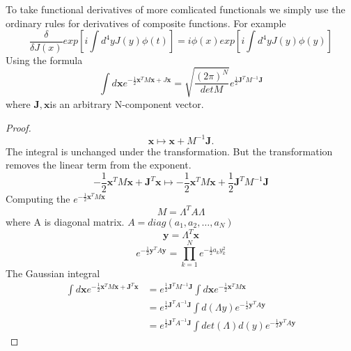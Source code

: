 \documentclass[a4paper,11pt]{article}
\newtheorem{proof}{proof}[section]
\begin{document}
To take functional derivatives of more comlicated functionals we simply use the ordinary rules for derivatives of composite functions. For example
\begin{equation*}
  \frac{\delta}{\delta J(x)}exp\left[i\int d^4y J(y)\phi(t)\right]=i\phi(x)exp\left[i\int d^4y J(y)\phi(y)\right]
\end{equation*}
Using the formula
\begin{equation*}
  \int d\mathbf{x}e^{-\frac{1}{2}\mathbf{x}^TM\mathbf{x}+J\mathbf{x}}=\sqrt{\frac{(2\pi)^N}{detM}}e^{\frac{1}{2}\mathbf{J}^TM^{-1}\mathbf{J}}
\end{equation*}
where $\mathbf{J},\mathbf{x}$is an arbitrary N-component vector.
\begin{proof}
  \begin{equation*}
    \mathbf{x}\mapsto\mathbf{x}+M^{-1}\mathbf{J}.
  \end{equation*}
  The integral is unchanged under the transformation. But the transformation removes the linear term from the exponent.
  \begin{equation*}
    -\frac{1}{2}\mathbf{x}^TM\mathbf{x}+\mathbf{J}^T\mathbf{x}\mapsto-\frac{1}{2}\mathbf{x}^TM\mathbf{x}+\frac{1}{2}\mathbf{J}^TM^{-1}\mathbf{J}
  \end{equation*}
  Computing the $e^{-\frac{1}{2}\mathbf{x}^TM\mathbf{x}}$
  \begin{equation*}
    M=\Lambda^TA\Lambda
  \end{equation*}
  where A is diagonal matrix. $A=diag(a_1,a_2,\dots,a_N)$
  \begin{equation*}
    \mathbf{y}=\Lambda^T\mathbf{x}
  \end{equation*}
  \begin{equation*}
    e^{-\frac{1}{2}\mathbf{y}^TA\mathbf{y}}=\prod_{k=1}^{N}e^{-\frac{1}{2}a_ky_k^2}
  \end{equation*}
  The Gaussian integral
  \begin{equation*}
    \begin{split}
       \int d\mathbf{x}e^{-\frac{1}{2}\mathbf{x}^TM\mathbf{x}+\mathbf{J}^T\mathbf{x}}&=e^{\frac{1}{2}\mathbf{J}^TM^{-1}\mathbf{J}}\int d\mathbf{x}e^{-\frac{1}{2}\mathbf{x}^TM\mathbf{x}}\\
         &=e^{\frac{1}{2}\mathbf{J}^TA^{-1}\mathbf{J}}\int d(\Lambda y)e^{-\frac{1}{2}\mathbf{y}^TA\mathbf{y}}\\
         &=e^{\frac{1}{2}\mathbf{J}^TA^{-1}\mathbf{J}}\int det(\Lambda)d(y)e^{-\frac{1}{2}\mathbf{y}^TA\mathbf{y}}
    \end{split}

\end{equation*}
\end{proof}
\end{document}
